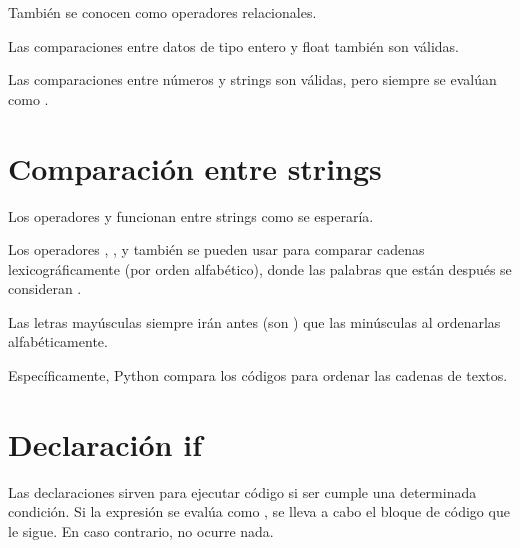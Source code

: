 
También se conocen como operadores relacionales.\smallskip

Las comparaciones entre datos de tipo entero y float también son válidas.


Las comparaciones entre números y strings son válidas, pero siempre se evalúan como .


\section{Comparación entre strings}

Los operadores \ttt{==} y \ttt{!=} funcionan entre strings como se esperaría.


Los operadores \ttt{>}, \ttt{<}, \ttt{>=} y \ttt{<=} también se pueden usar para comparar cadenas lexicográficamente (por orden alfabético), donde las palabras que están después se consideran .


Las letras mayúsculas siempre irán antes (son ) que las minúsculas al ordenarlas alfabéticamente.


Específicamente, Python compara los códigos  para ordenar las cadenas de textos.

\section{Declaración if}

Las declaraciones  sirven para ejecutar código si ser cumple una determinada condición. Si la expresión se evalúa como , se lleva a cabo el bloque de código que le sigue. En caso contrario, no ocurre nada.


